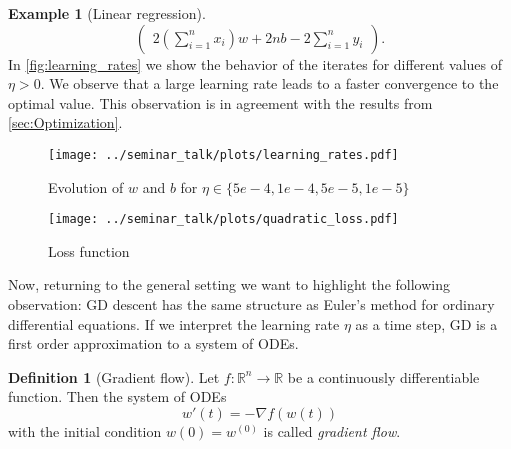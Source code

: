 \documentclass[12pt]{article}
\theoremstyle{definition}
\newtheorem{definition}[theorem]{Definition}
\newtheorem{example}[theorem]{Example}
\numberwithin{equation}{section}
\newcommand{\R}{\mathbb{R}}
\begin{document}
\begin{example}[Linear regression]
\begin{equation}
\begin{pmatrix}
      2 \left(\displaystyle\sum_{i=1}^n x_i\right) w + 2nb - 2 \displaystyle\sum_{i=1}^n y_i
    \end{pmatrix}.
  \end{equation}
  In \autoref{fig:learning_rates} we show the behavior of the iterates for different values of $\eta >0$. We observe that a large learning rate leads to a faster convergence to the optimal value. This observation is in agreement with the results from \autoref{sec:Optimization}.
  \begin{figure}[htb]
    \centering
    \texttt{[image: ../seminar\_talk/plots/learning\_rates.pdf]}
    \caption{Evolution of $w$ and $b$ for $\eta \in \{5e-4,1e-4,5e-5,1e-5\}$}
    \label{fig:learning_rates}
  \end{figure}

  \begin{figure}[htb]
    \centering
    \texttt{[image: ../seminar\_talk/plots/quadratic\_loss.pdf]}
    \caption{Loss function}
    \label{fig:quadratic_loss_function}
  \end{figure}
\end{example}
Now, returning to the general setting we want to highlight the following observation: GD descent has the same structure as Euler's method for ordinary differential equations. If we interpret the learning rate $\eta$ as a time step, GD is a first order approximation to a system of ODEs.
\begin{definition}[Gradient flow]
  Let $f : \R^n \rightarrow \R$ be a continuously differentiable function. Then the system of ODEs
  \begin{equation}
  w'(t) = - \nabla f(w(t))
  \end{equation}
  with the initial condition $w(0) = w^{(0)}$ is called \emph{gradient flow}.
\end{definition}
\end{document}
